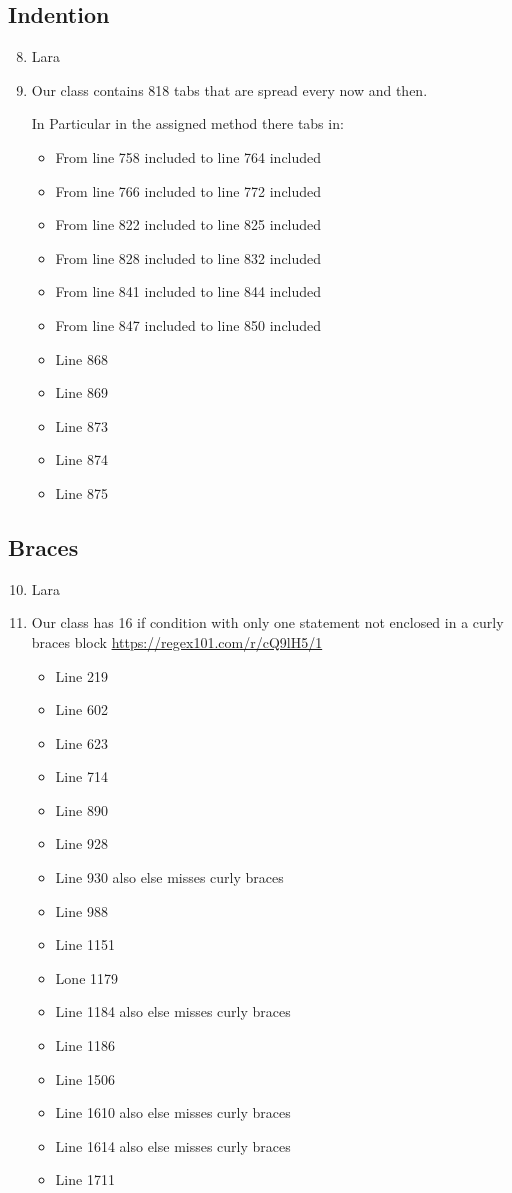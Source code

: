 \subsection{Indention}
\begin{enumerate}
	\setcounter{enumi}{7}
	\item Lara
	\item Our class contains 818 tabs that are spread every now and then.
	
	In Particular in the assigned method there tabs in:
	\begin{itemize}
		\item From line 758 included to line 764 included
		\item From line 766 included to line 772 included
		\item From line 822 included to line 825 included
		\item From line 828 included to line 832 included
		\item From line 841 included to line 844 included
		\item From line 847 included to line 850 included
		\item Line 868
		\item Line 869
		\item Line 873
		\item Line 874
		\item Line 875
	\end{itemize}
\end{enumerate}
\subsection{Braces}
\begin{enumerate}
	\setcounter{enumi}{9}
	\item Lara
	\item Our class has 16 if condition with only one statement not enclosed in a curly braces block \url{https://regex101.com/r/cQ9lH5/1}
	\begin{itemize}
		\item Line 219
		\item Line 602
		\item Line 623
		\item Line 714
		\item Line 890
		\item Line 928
		\item Line 930 also else misses curly braces
		\item Line 988
		\item Line 1151
		\item Lone 1179
		\item Line 1184 also else misses curly braces
		\item Line 1186
		\item Line 1506
		\item Line 1610 also else misses curly braces
		\item Line 1614 also else misses curly braces
		\item Line 1711
	\end{itemize}
\end{enumerate}
